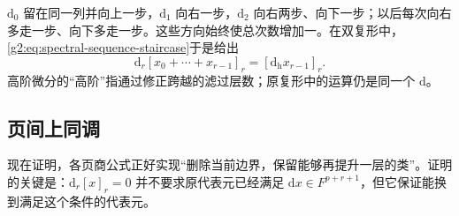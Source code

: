 \(\mathrm d_0\) 留在同一列并向上一步，\(\mathrm d_1\) 向右一步，\(\mathrm d_2\) 向右两步、向下一步；以后每次向右多走一步、向下多走一步。这些方向始终使总次数增加一。在双复形中，\eqref{g2:eq:spectral-sequence-staircase}于是给出
\[
	\mathrm d_r[x_0+\cdots+x_{r-1}]_r=[\mathrm d_{\mathrm h}x_{r-1}]_r.
\]
高阶微分的“高阶”指通过修正跨越的滤过层数；原复形中的运算仍是同一个 \(\mathrm d\)。

\subsection{页间上同调}
\label{g2:subsec:1002:04}

现在证明，各页商公式正好实现“删除当前边界，保留能够再提升一层的类”。证明的关键是：\(\mathrm d_r[x]_r=0\) 并不要求原代表元已经满足 \(\mathrm dx\in F^{p+r+1}\)，但它保证能换到满足这个条件的代表元。

